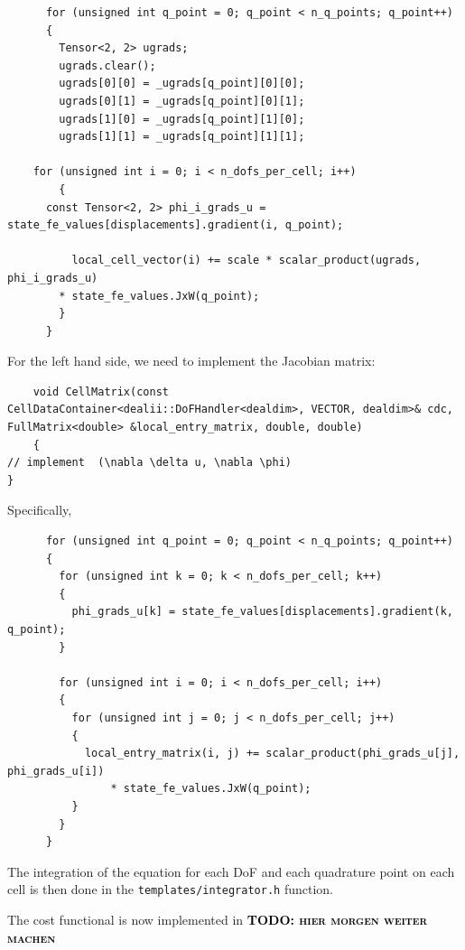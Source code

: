 \documentclass[prodmode,acmtoms]{acmsmall}
\numberwithin{equation}{section}
\renewcommand{\phi}{\varphi}
\newcommand{\todo}[1]{\textbf{\textsc{\textcolor{black}{TODO: #1}}}}
\begin{document}
\begin{lstlisting}
      for (unsigned int q_point = 0; q_point < n_q_points; q_point++)
      {
        Tensor<2, 2> ugrads;
        ugrads.clear();
        ugrads[0][0] = _ugrads[q_point][0][0];
        ugrads[0][1] = _ugrads[q_point][0][1];
        ugrads[1][0] = _ugrads[q_point][1][0];
        ugrads[1][1] = _ugrads[q_point][1][1];

	for (unsigned int i = 0; i < n_dofs_per_cell; i++)
        {
	  const Tensor<2, 2> phi_i_grads_u = state_fe_values[displacements].gradient(i, q_point);

          local_cell_vector(i) += scale * scalar_product(ugrads, phi_i_grads_u) 
	    * state_fe_values.JxW(q_point);
        }
      }
\end{lstlisting}
For the left hand side, we need to implement the Jacobian matrix:
\begin{lstlisting}
    void CellMatrix(const CellDataContainer<dealii::DoFHandler<dealdim>, VECTOR, dealdim>& cdc, FullMatrix<double> &local_entry_matrix, double, double)
    {
// implement  (\nabla \delta u, \nabla \phi)
}
\end{lstlisting}
Specifically,
\begin{lstlisting}
      for (unsigned int q_point = 0; q_point < n_q_points; q_point++)
      {
        for (unsigned int k = 0; k < n_dofs_per_cell; k++)
        {
          phi_grads_u[k] = state_fe_values[displacements].gradient(k, q_point);
        }

        for (unsigned int i = 0; i < n_dofs_per_cell; i++)
        {
          for (unsigned int j = 0; j < n_dofs_per_cell; j++)
          {
            local_entry_matrix(i, j) += scalar_product(phi_grads_u[j], phi_grads_u[i]) 
                * state_fe_values.JxW(q_point);
          }
        }
      }
\end{lstlisting}
The integration of the equation for each DoF and each quadrature point on each
cell is then done 
in the \texttt{templates/integrator.h} function. 


The cost functional is now implemented in \todo{hier morgen weiter machen}
\end{document}
